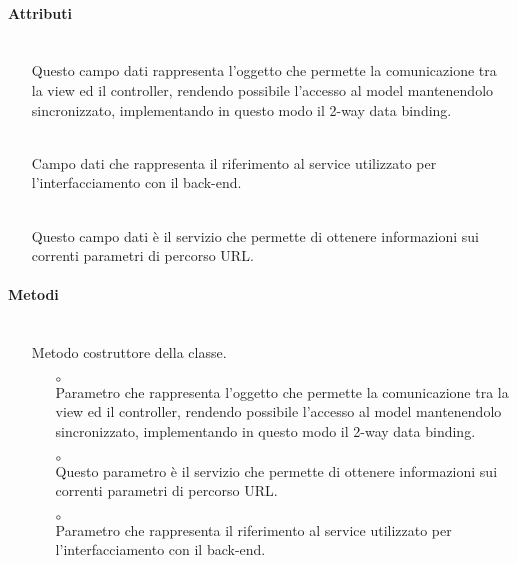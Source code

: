 \paragraph*{Attributi}
\begin{itemize}
\item[]  \\ Questo campo dati rappresenta l'oggetto che permette la comunicazione tra la view ed il controller, rendendo possibile l’accesso al model mantenendolo sincronizzato, implementando in questo modo il 2-way data binding.
\item[]  \\ Campo dati che rappresenta il riferimento al service utilizzato per l'interfacciamento con il back-end.
\item[]  \\ Questo campo dati è il servizio che permette di ottenere informazioni sui correnti parametri di percorso URL.
\end{itemize}

\paragraph*{Metodi}
\begin{itemize}
\item[]  \\ Metodo costruttore della classe.
\begin{itemize}\addtolength{\itemsep}{-0.5\baselineskip}
\item[$\circ$]  \\ Parametro che rappresenta l'oggetto che permette la comunicazione tra la view ed il controller, rendendo possibile l’accesso al model mantenendolo sincronizzato, implementando in questo modo il 2-way data binding.
\item[$\circ$]  \\ Questo parametro è il servizio che permette di ottenere informazioni sui correnti parametri di percorso URL.
\item[$\circ$]  \\ Parametro che rappresenta il riferimento al service utilizzato per l'interfacciamento con il back-end.
\end{itemize}
\end{itemize}

